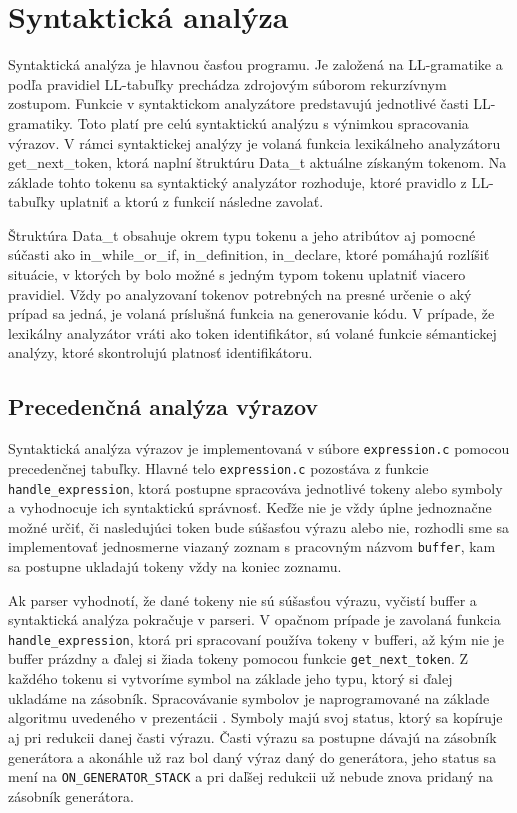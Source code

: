 \documentclass [11pt, a4paper]{article}
\begin{document}
\section{Syntaktická analýza}
Syntaktická analýza je hlavnou časťou programu.
Je založená na LL-gramatike a podľa pravidiel LL-tabuľky prechádza zdrojovým súborom rekurzívnym zostupom. Funkcie v syntaktickom analyzátore predstavujú jednotlivé časti LL-gramatiky. Toto platí pre celú syntaktickú analýzu s výnimkou spracovania výrazov. V rámci syntaktickej analýzy je volaná funkcia lexikálneho analyzátoru get\_next\_token, ktorá naplní štruktúru Data\_t aktuálne získaným tokenom. Na základe tohto tokenu sa syntaktický analyzátor rozhoduje, ktoré pravidlo z LL-tabuľky uplatniť a ktorú z funkcií následne zavolať.


Štruktúra Data\_t obsahuje okrem typu tokenu a jeho atribútov aj pomocné súčasti ako in\_while\_or\_if, in\_definition, in\_declare, ktoré pomáhajú rozlíšiť situácie, v ktorých by bolo možné s jedným typom tokenu uplatniť viacero pravidiel. Vždy po analyzovaní tokenov potrebných na presné určenie o aký prípad sa jedná, je volaná príslušná funkcia na generovanie kódu. 
V prípade, že lexikálny analyzátor vráti ako token identifikátor, sú volané funkcie sémantickej analýzy, ktoré skontrolujú platnosť identifikátoru.


\subsection{Precedenčná analýza výrazov}
Syntaktická analýza výrazov je implementovaná v súbore \texttt{expression.c} pomocou precedenčnej tabuľky. Hlavné telo \texttt{expression.c} pozostáva z funkcie \texttt{handle\_expression}, ktorá postupne spracováva jednotlivé tokeny alebo symboly a vyhodnocuje ich syntaktickú správnosť. Keďže nie je vždy úplne jednoznačne možné určiť, či nasledujúci token bude súšasťou výrazu alebo nie, rozhodli sme sa implementovať jednosmerne viazaný zoznam s pracovným názvom \texttt{buffer}, kam sa postupne ukladajú tokeny vždy na koniec zoznamu.

 Ak parser vyhodnotí, že dané tokeny nie sú súšasťou výrazu, vyčistí buffer a syntaktická analýza pokračuje v parseri. V opačnom prípade je zavolaná funkcia \texttt{handle\_expression}, ktorá pri spracovaní používa tokeny v bufferi, až kým nie je buffer prázdny a ďalej si žiada tokeny pomocou funkcie \texttt{get\_next\_token}. Z každého tokenu si vytvoríme symbol na základe jeho typu, ktorý si ďalej ukladáme na zásobník. Spracovávanie symbolov je naprogramované na základe algoritmu uvedeného v prezentácii \cite{IFJpred}. Symboly majú svoj status, ktorý sa kopíruje aj pri redukcii danej časti výrazu. Časti výrazu sa postupne dávajú na zásobník generátora a akonáhle už raz bol daný výraz daný do generátora, jeho status sa mení na \texttt{ON\_GENERATOR\_STACK} a pri daľšej redukcii už nebude znova pridaný na zásobník generátora. 
\end{document}
